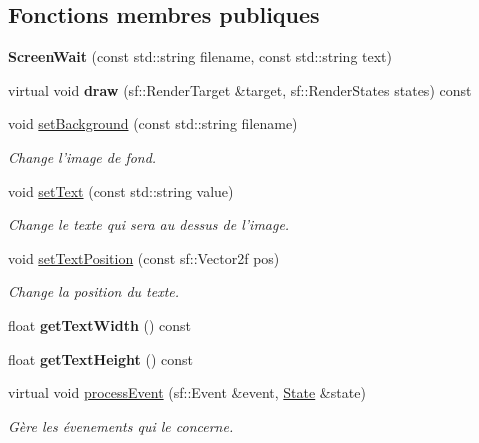 \subsection*{Fonctions membres publiques}
\begin{DoxyCompactItemize}
\item 
\hypertarget{class_screen_wait_af02e6acabec3f434336bdb890f5d0854}{{\bfseries Screen\+Wait} (const std\+::string filename, const std\+::string text)}\label{class_screen_wait_af02e6acabec3f434336bdb890f5d0854}

\item 
\hypertarget{class_screen_wait_ac861b769eb48ff335463505eea594d0f}{virtual void {\bfseries draw} (sf\+::\+Render\+Target \&target, sf\+::\+Render\+States states) const }\label{class_screen_wait_ac861b769eb48ff335463505eea594d0f}

\item 
void \hyperlink{class_screen_wait_a0ea23f910b91933bc3c0aad0908b3b52}{set\+Background} (const std\+::string filename)
\begin{DoxyCompactList}\small\item\em Change l'image de fond. \end{DoxyCompactList}\item 
void \hyperlink{class_screen_wait_a713936eb00c1198d1ab9a0192aaa8ec7}{set\+Text} (const std\+::string value)
\begin{DoxyCompactList}\small\item\em Change le texte qui sera au dessus de l'image. \end{DoxyCompactList}\item 
void \hyperlink{class_screen_wait_afcfc72227d36a8b9c45bb37205dd4663}{set\+Text\+Position} (const sf\+::\+Vector2f pos)
\begin{DoxyCompactList}\small\item\em Change la position du texte. \end{DoxyCompactList}\item 
\hypertarget{class_screen_wait_ad7afbbbdf3ad78afc1d7990274aa4bfc}{float {\bfseries get\+Text\+Width} () const }\label{class_screen_wait_ad7afbbbdf3ad78afc1d7990274aa4bfc}

\item 
\hypertarget{class_screen_wait_a725b129bc47b6aa921ad4f7056f44235}{float {\bfseries get\+Text\+Height} () const }\label{class_screen_wait_a725b129bc47b6aa921ad4f7056f44235}

\item 
virtual void \hyperlink{class_screen_wait_afe115910cee5cb031ba0d968cbd9d548}{process\+Event} (sf\+::\+Event \&event, \hyperlink{gamestate_8h_a5d74787dedbc4e11c1ab15bf487e61f8}{State} \&state)
\begin{DoxyCompactList}\small\item\em Gère les évenements qui le concerne. \end{DoxyCompactList}\end{DoxyCompactItemize}


